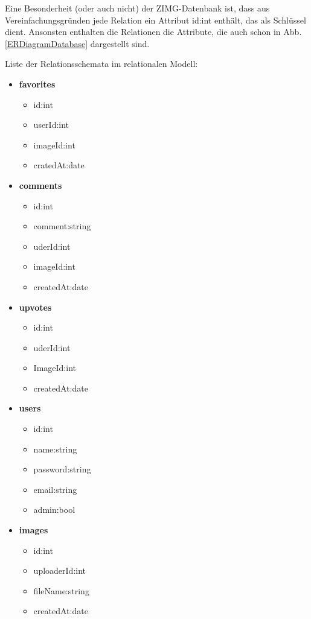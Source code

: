 \documentclass[12pt, oneside, a4paper]{article}		%
\begin{document}
Eine Besonderheit (oder auch nicht) der ZIMG-Datenbank ist, dass aus Vereinfachungsgründen jede Relation ein Attribut id:int enthält, das als Schlüssel dient. Ansonsten enthalten die Relationen die Attribute, die auch schon in Abb. \ref{ERDiagramDatabase} dargestellt sind.

Liste der Relationsschemata im relationalen Modell:

\begin{itemize}
	\item \textbf{favorites}
	\begin{itemize}
		\item id:int
		\item userId:int
		\item imageId:int
		\item cratedAt:date
	\end{itemize}
	\item \textbf{comments}
	\begin{itemize}
		\item id:int
		\item comment:string
		\item uderId:int
		\item imageId:int
		\item createdAt:date
	\end{itemize}
	\item \textbf{upvotes}
	\begin{itemize}
		\item id:int
		\item uderId:int
		\item ImageId:int
		\item createdAt:date
	\end{itemize}
	\item \textbf{users}
	\begin{itemize}
		\item id:int
		\item name:string
		\item password:string
		\item email:string
		\item admin:bool
	\end{itemize}
	\item \textbf{images}
	\begin{itemize}
		\item id:int
		\item uploaderId:int
		\item fileName:string
		\item createdAt:date

\end{itemize}
\end{itemize}
\end{document}
